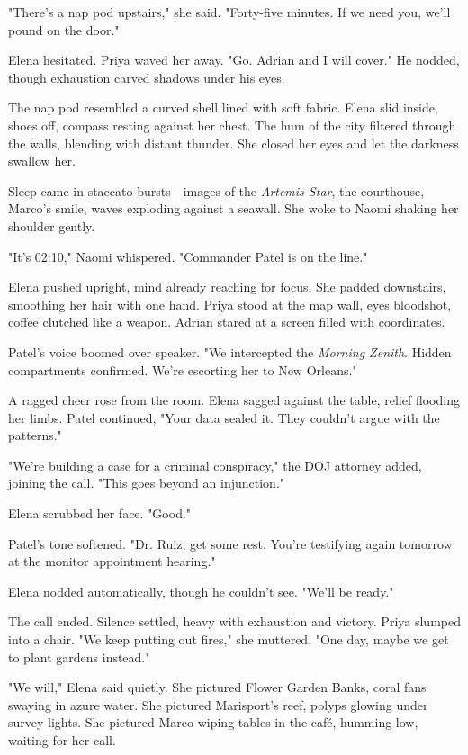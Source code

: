 "There's a nap pod upstairs," she said. "Forty-five minutes. If we need you, we'll pound on the door."

Elena hesitated. Priya waved her away. "Go. Adrian and I will cover." He nodded, though exhaustion carved shadows under his eyes.

The nap pod resembled a curved shell lined with soft fabric. Elena slid inside, shoes off, compass resting against her chest. The hum of the city filtered through the walls, blending with distant thunder. She closed her eyes and let the darkness swallow her.

Sleep came in staccato bursts—images of the \textit{Artemis Star}, the courthouse, Marco's smile, waves exploding against a seawall. She woke to Naomi shaking her shoulder gently.

"It's 02:10," Naomi whispered. "Commander Patel is on the line."

Elena pushed upright, mind already reaching for focus. She padded downstairs, smoothing her hair with one hand. Priya stood at the map wall, eyes bloodshot, coffee clutched like a weapon. Adrian stared at a screen filled with coordinates.

Patel's voice boomed over speaker. "We intercepted the \textit{Morning Zenith}. Hidden compartments confirmed. We're escorting her to New Orleans."

A ragged cheer rose from the room. Elena sagged against the table, relief flooding her limbs. Patel continued, "Your data sealed it. They couldn't argue with the patterns."

"We're building a case for a criminal conspiracy," the DOJ attorney added, joining the call. "This goes beyond an injunction."

Elena scrubbed her face. "Good."

Patel's tone softened. "Dr. Ruiz, get some rest. You're testifying again tomorrow at the monitor appointment hearing."

Elena nodded automatically, though he couldn't see. "We'll be ready."

The call ended. Silence settled, heavy with exhaustion and victory. Priya slumped into a chair. "We keep putting out fires," she muttered. "One day, maybe we get to plant gardens instead."

"We will," Elena said quietly. She pictured Flower Garden Banks, coral fans swaying in azure water. She pictured Marisport's reef, polyps glowing under survey lights. She pictured Marco wiping tables in the café, humming low, waiting for her call.

